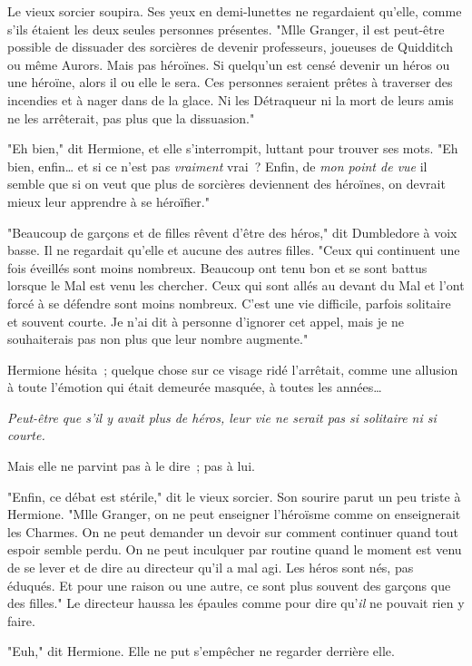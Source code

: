 Le vieux sorcier soupira. Ses yeux en demi-lunettes ne regardaient qu'elle, comme s'ils étaient les deux seules personnes présentes. "Mlle Granger, il est peut-être possible de dissuader des sorcières de devenir professeurs, joueuses de Quidditch ou même Aurors. Mais pas héroïnes. Si quelqu'un est censé devenir un héros ou une héroïne, alors il ou elle le sera. Ces personnes seraient prêtes à traverser des incendies et à nager dans de la glace. Ni les Détraqueur ni la mort de leurs amis ne les arrêterait, pas plus que la dissuasion."

"Eh bien," dit Hermione, et elle s'interrompit, luttant pour trouver ses mots. "Eh bien, enfin… et si ce n'est pas \emph{vraiment} vrai~? Enfin, de \emph{mon point de vue} il semble que si on veut que plus de sorcières deviennent des héroïnes, on devrait mieux leur apprendre à se héroïfier."

"Beaucoup de garçons et de filles rêvent d'être des héros," dit Dumbledore à voix basse. Il ne regardait qu'elle et aucune des autres filles. "Ceux qui continuent une fois éveillés sont moins nombreux. Beaucoup ont tenu bon et se sont battus lorsque le Mal est venu les chercher. Ceux qui sont allés au devant du Mal et l'ont forcé à se défendre sont moins nombreux. C'est une vie difficile, parfois solitaire et souvent courte. Je n'ai dit à personne d'ignorer cet appel, mais je ne souhaiterais pas non plus que leur nombre augmente."

Hermione hésita~; quelque chose sur ce visage ridé l'arrêtait, comme une allusion à toute l'émotion qui était demeurée masquée, à toutes les années…

\emph{Peut-être que s'il y avait plus de héros, leur vie ne serait pas si solitaire ni si courte.}

Mais elle ne parvint pas à le dire~; pas à lui.

"Enfin, ce débat est stérile," dit le vieux sorcier. Son sourire parut un peu triste à Hermione. "Mlle Granger, on ne peut enseigner l'héroïsme comme on enseignerait les Charmes. On ne peut demander un devoir sur comment continuer quand tout espoir semble perdu. On ne peut inculquer par routine quand le moment est venu de se lever et de dire au directeur qu'il a mal agi. Les héros sont nés, pas éduqués. Et pour une raison ou une autre, ce sont plus souvent des garçons que des filles." Le directeur haussa les épaules comme pour dire qu'\emph{il} ne pouvait rien y faire.

"Euh," dit Hermione. Elle ne put s'empêcher ne regarder derrière elle.

